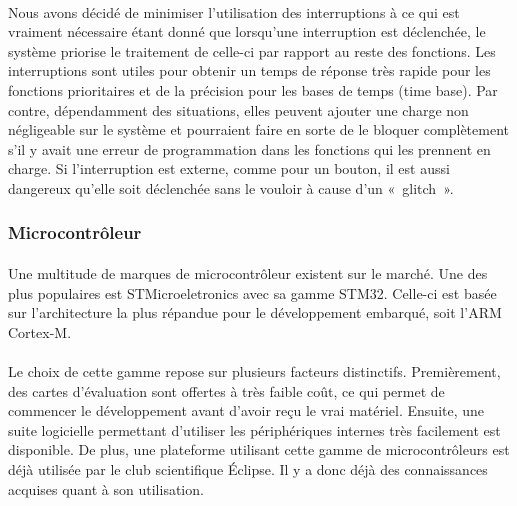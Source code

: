 		\paragraph*{}
		Nous avons décidé de minimiser l’utilisation des interruptions à ce qui est vraiment nécessaire étant donné que lorsqu’une interruption est déclenchée, le système priorise le traitement de celle-ci par rapport au reste des fonctions. Les interruptions sont utiles pour obtenir un temps de réponse très rapide pour les fonctions prioritaires et de la précision pour les bases de temps (time base). Par contre, dépendamment des situations, elles peuvent ajouter une charge non négligeable sur le système et pourraient faire en sorte de le bloquer complètement s’il y avait une erreur de programmation dans les fonctions qui les prennent en charge. Si l’interruption est externe, comme pour un bouton, il est aussi dangereux qu’elle soit déclenchée sans le vouloir à cause d’un « glitch ».

	\subsubsection{Microcontrôleur}
		\paragraph*{}
		Une multitude de marques de microcontrôleur existent sur le marché. Une des plus populaires est STMicroeletronics avec sa gamme STM32. Celle-ci est basée sur l’architecture la plus répandue pour le développement embarqué, soit l’ARM Cortex-M.

		\paragraph*{}
		Le choix de cette gamme repose sur plusieurs facteurs distinctifs. Premièrement, des cartes d’évaluation sont offertes à très faible coût, ce qui permet de commencer le développement avant d’avoir reçu le vrai matériel. Ensuite, une suite logicielle permettant d’utiliser les périphériques internes très facilement est disponible. De plus, une plateforme utilisant cette gamme de microcontrôleurs est déjà utilisée par le club scientifique Éclipse. Il y a donc déjà des connaissances acquises quant à son utilisation.
